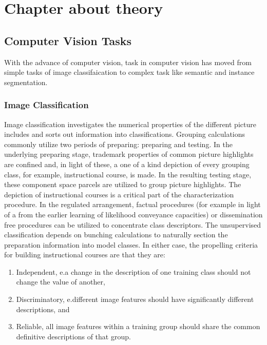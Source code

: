 \chapter{Chapter about theory}\label{ch:THEORY}
\section{Computer Vision Tasks}
With the advance of computer vision, task in computer vision has moved from simple tasks  of image classifaication to complex task like semantic and instance segmentation. 
\subsection{Image Classification}
Image classification investigates the numerical properties of the different picture includes and sorts out information into classifications. Grouping calculations commonly utilize two periods of preparing: preparing and testing. In the underlying preparing stage, trademark properties of common picture highlights are confined and, in light of these, a one of a kind depiction of every grouping class, for example, instructional course, is made. In the resulting testing stage, these component space parcels are utilized to group picture highlights. The depiction of instructional courses is a critical part of the characterization procedure. In the regulated arrangement, factual procedures (for example in light of a from the earlier learning of likelihood conveyance capacities) or dissemination free procedures can be utilized to concentrate class descriptors. The unsupervised classification depends on bunching calculations to naturally section the preparation information into model classes. In either case, the propelling criteria for building instructional courses are that they are:
\begin{enumerate}
\item Independent, e.a change in the description of one training class should not change the value of another,
\item Discriminatory, e.different image features should have significantly different descriptions, and
\item Reliable, all image features within a training group should share the common definitive descriptions of that group.
\end{enumerate}

